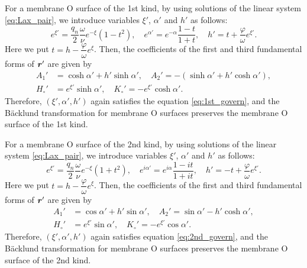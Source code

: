 \documentclass[10pt,a4paper]{amsart}
\def\br{\mbox{\boldmath $r$}}
\begin{document}
\begin{thm}
\label{thm:main2_1st}
For a membrane O surface of the 1st kind, by using solutions of the linear system \eqref{eq:Lax_pair}, we introduce variables $\xi'$, $\alpha'$ and $h'$ as follows:
\begin{equation}
e^{\xi'} = \frac{q_n}{2} \frac{\omega}{\nu} e^{-\xi} (1-t^2), \quad
e^{\alpha'} = e^{-\alpha} \frac{1-t}{1+t}, \quad
h' = t + \frac{\varphi}{\omega} e^{\xi'}.
\end{equation}
Here we put $t = h - \dfrac{\varphi}{\omega} e^\xi$.
Then, the coefficients of the first and third fundamental forms of $\br'$ are given by
\begin{equation}
\begin{aligned}
A_1' &= \cosh \alpha' + h' \sinh \alpha', \quad
A_2' = - (\sinh \alpha' + h' \cosh \alpha'),\\
H_\circ' &= e^{\xi'} \sinh \alpha', \quad
K_\circ' = - e^{\xi'} \cosh \alpha'.
\end{aligned}
\end{equation}
Therefore, $(\xi', \alpha', h')$ again satisfies the equation \eqref{eq:1st_govern}, and the B\"acklund transformation for membrane O surfaces preserves the membrane O surface of the 1st kind.
\end{thm}

\begin{thm}
\label{thm:main2_2nd}
For a membrane O surface of the 2nd kind, by using solutions of the linear system \eqref{eq:Lax_pair}, we introduce variables $\xi'$, $\alpha'$ and $h'$ as follows:
\begin{equation}
e^{\xi'} = \frac{q_n}{2} \frac{\omega}{\nu} e^{-\xi} (1+t^2), \quad
e^{i\alpha'} = e^{i\alpha} \frac{1-it}{1+it}, \quad
h' = -t + \frac{\varphi}{\omega}e^{\xi'}.
\end{equation}
Here we put $t = h - \dfrac{\varphi}{\omega} e^\xi$.
Then, the coefficients of the first and third fundamental forms of $\br'$ are given by
\begin{equation}
\begin{aligned}
A_1' &= \cos \alpha' + h' \sin \alpha', \quad
A_2' = \sin \alpha' - h' \cosh \alpha',\\
H_\circ' &= e^{\xi'} \sin \alpha', \quad
K_\circ' = - e^{\xi'} \cos \alpha'.
\end{aligned}
\end{equation}
Therefore, $(\xi', \alpha', h')$ again satisfies equation \eqref{eq:2nd_govern}, and the B\"acklund transformation for membrane O surfaces preserves the membrane O surface of the 2nd kind.
\end{thm}
\end{document}
